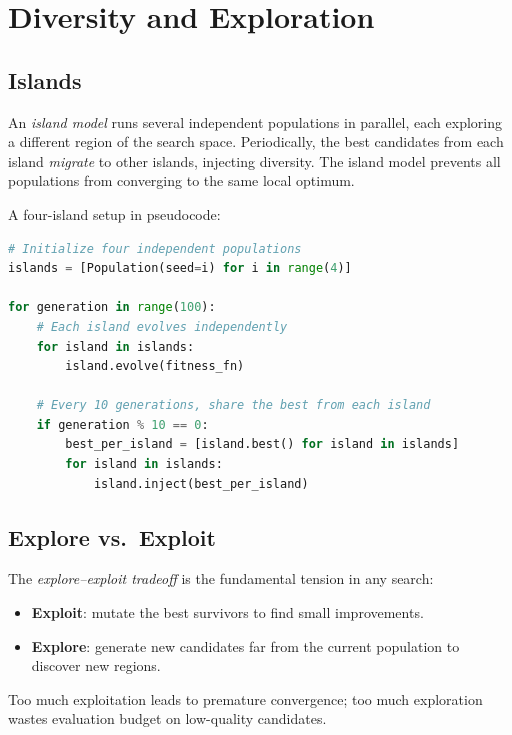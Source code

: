 \section{Diversity and Exploration}
\label{section:Diversity}

\subsection{Islands}

An \emph{island model} runs several independent populations in parallel, each exploring a different region of the search space.
Periodically, the best candidates from each island \emph{migrate} to other islands, injecting diversity.
The island model prevents all populations from converging to the same local optimum.

\begin{example}
A four-island setup in pseudocode:
\begin{lstlisting}[language=python]
# Initialize four independent populations
islands = [Population(seed=i) for i in range(4)]

for generation in range(100):
    # Each island evolves independently
    for island in islands:
        island.evolve(fitness_fn)

    # Every 10 generations, share the best from each island
    if generation % 10 == 0:
        best_per_island = [island.best() for island in islands]
        for island in islands:
            island.inject(best_per_island)
\end{lstlisting}
\end{example}

\subsection{Explore vs.\ Exploit}

The \emph{explore–exploit tradeoff} is the fundamental tension in any search:
\begin{itemize}
\item \textbf{Exploit}: mutate the best survivors to find small improvements.
\item \textbf{Explore}: generate new candidates far from the current population to discover new regions.
\end{itemize}
Too much exploitation leads to premature convergence; too much exploration wastes evaluation budget on low-quality candidates.


